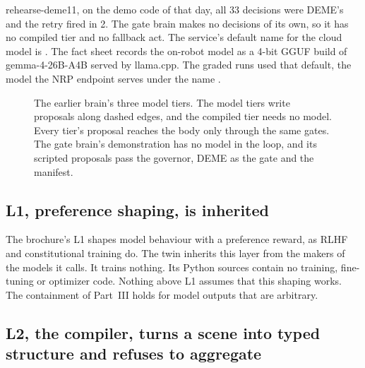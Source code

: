 rehearse-deme11, on the demo code of that day, all 33 decisions were DEME's and the retry fired in
2. The gate brain makes no decisions of its own, so it has no compiled tier and no fallback act.
The service's default name for the cloud model is . The fact sheet records the
on-robot model as a 4-bit GGUF build of gemma-4-26B-A4B served by llama.cpp.
The graded runs used that default, the model the NRP endpoint serves under the name .

\begin{figure}[t]
\centering

\caption{The earlier brain's three model tiers. The model tiers write proposals along dashed edges,
and the compiled tier needs no model. Every tier's proposal reaches the body only through the same
gates. The gate brain's demonstration has no model in the loop, and its scripted proposals pass the
governor, DEME as the gate and the manifest.}
\label{fig:pe-tiers}
\end{figure}

\subsection*{L1, preference shaping, is inherited}

The brochure's L1 shapes model behaviour with a preference reward, as RLHF and constitutional
training do.
The twin inherits this layer from the makers of the models it calls. It trains nothing. Its
Python sources contain no training, fine-tuning or optimizer code.
Nothing above L1 assumes that this shaping works. The containment of Part~III holds for model
outputs that are arbitrary.

\subsection*{L2, the compiler, turns a scene into typed structure and refuses to aggregate}

